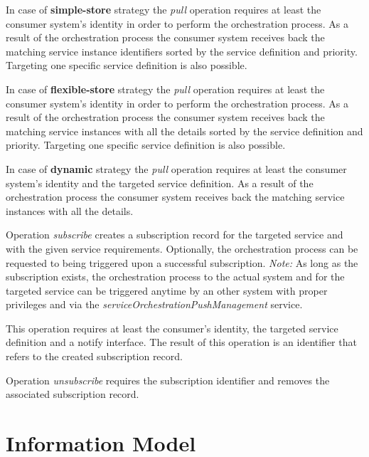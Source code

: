 \documentclass[a4paper]{arrowhead}
\begin{document}
In case of \textbf{simple-store} strategy the \textit{pull} operation requires at least the consumer system's identity in order to perform the orchestration process. As a result of the orchestration process the consumer system receives back the matching service instance identifiers sorted by the service definition and priority. Targeting one specific service definition is also possible.

In case of \textbf{flexible-store} strategy the \textit{pull} operation requires at least the consumer system's identity in order to perform the orchestration process. As a result of the orchestration process the consumer system receives back the matching service instances with all the details sorted by the service definition and priority. Targeting one specific service definition is also possible.

In case of \textbf{dynamic} strategy the \textit{pull} operation requires at least the consumer system's identity and the targeted service definition. As a result of the orchestration process the consumer system receives back the matching service instances with all the details.


Operation \textit{subscribe} creates a subscription record for the targeted service and with the given service requirements. Optionally, the orchestration process can be requested to being triggered upon a successful subscription. 
\textit{Note:} As long as the subscription exists, the orchestration process to the actual system and for the targeted service can be triggered anytime by an other system with proper privileges and via the \textit{serviceOrchestrationPushManagement} service.

This operation requires at least the consumer's identity, the targeted service definition and a notify interface. The result of this operation is an identifier that refers to the created subscription record.


Operation \textit{unsubscribe} requires the subscription identifier and removes the associated subscription record.

\clearpage

\section{Information Model}
\label{sec:model}
\end{document}
